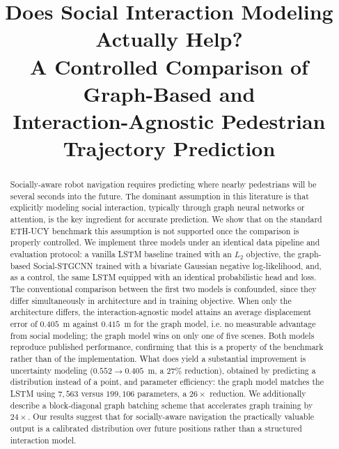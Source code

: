 \documentclass[conference]{IEEEtran}
\begin{document}
\title{Does Social Interaction Modeling Actually Help?\\
A Controlled Comparison of Graph-Based and\\
Interaction-Agnostic Pedestrian Trajectory Prediction}

\author{
}

\maketitle

\begin{abstract}
Socially-aware robot navigation requires predicting where nearby pedestrians will be
several seconds into the future. The dominant assumption in this literature is that
explicitly modeling social interaction, typically through graph neural networks or
attention, is the key ingredient for accurate prediction. We show that on the standard
ETH-UCY benchmark this assumption is not supported once the comparison is properly
controlled. We implement three models under an identical data pipeline and evaluation
protocol: a vanilla LSTM baseline trained with an $L_2$ objective, the graph-based
Social-STGCNN trained with a bivariate Gaussian negative log-likelihood, and, as a
control, the same LSTM equipped with an identical probabilistic head and loss. The
conventional comparison between the first two models is confounded, since they differ
simultaneously in architecture and in training objective. When only the architecture
differs, the interaction-agnostic model attains an average displacement error of
$0.405$~m against $0.415$~m for the graph model, i.e. no measurable advantage from social
modeling; the graph model wins on only one of five scenes. Both models reproduce
published performance, confirming that this is a property of the benchmark rather than of
the implementation. What does yield a substantial improvement is uncertainty modeling
($0.552 \rightarrow 0.405$~m, a $27\%$ reduction), obtained by predicting a distribution
instead of a point, and parameter efficiency: the graph model matches the LSTM using
$7{,}563$ versus $199{,}106$ parameters, a $26\times$ reduction. We additionally describe
a block-diagonal graph batching scheme that accelerates graph training by $24\times$. Our
results suggest that for socially-aware navigation the practically valuable output is a
calibrated distribution over future positions rather than a structured interaction model.
\end{abstract}
\end{document}
